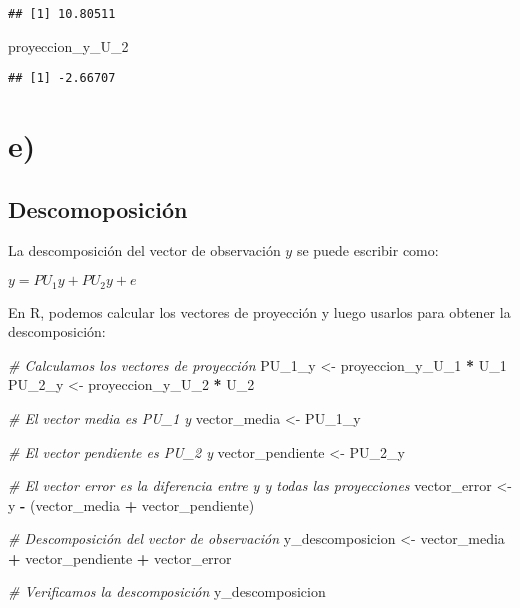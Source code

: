 \documentclass[
]{article}
\newenvironment{Shaded}{\begin{snugshade}}{\end{snugshade}}
\newcommand{\CommentTok}[1]{\textcolor[rgb]{0.56,0.35,0.01}{\textit{#1}}}
\newcommand{\NormalTok}[1]{#1}
\newcommand{\OtherTok}[1]{\textcolor[rgb]{0.56,0.35,0.01}{#1}}
\newcommand{\SpecialCharTok}[1]{\textcolor[rgb]{0.81,0.36,0.00}{\textbf{#1}}}
\begin{document}
\begin{verbatim}
## [1] 10.80511
\end{verbatim}

\begin{Shaded}
\begin{Highlighting}[]
\NormalTok{proyeccion\_y\_U\_2}
\end{Highlighting}
\end{Shaded}

\begin{verbatim}
## [1] -2.66707
\end{verbatim}

\hypertarget{e}{%
\section{e)}\label{e}}

\hypertarget{descomoposiciuxf3n}{%
\subsection{Descomoposición}\label{descomoposiciuxf3n}}

La descomposición del vector de observación \(y\) se puede escribir
como:

\(y = PU_1 y + PU_2 y + e\)

En R, podemos calcular los vectores de proyección y luego usarlos para
obtener la descomposición:

\begin{Shaded}
\begin{Highlighting}[]
\CommentTok{\# Calculamos los vectores de proyección}
\NormalTok{PU\_1\_y }\OtherTok{\textless{}{-}}\NormalTok{ proyeccion\_y\_U\_1 }\SpecialCharTok{*}\NormalTok{ U\_1}
\NormalTok{PU\_2\_y }\OtherTok{\textless{}{-}}\NormalTok{ proyeccion\_y\_U\_2 }\SpecialCharTok{*}\NormalTok{ U\_2}

\CommentTok{\# El vector media es PU\_1 y}
\NormalTok{vector\_media }\OtherTok{\textless{}{-}}\NormalTok{ PU\_1\_y}

\CommentTok{\# El vector pendiente es PU\_2 y}
\NormalTok{vector\_pendiente }\OtherTok{\textless{}{-}}\NormalTok{ PU\_2\_y}

\CommentTok{\# El vector error es la diferencia entre y y todas las proyecciones}
\NormalTok{vector\_error }\OtherTok{\textless{}{-}}\NormalTok{ y }\SpecialCharTok{{-}}\NormalTok{ (vector\_media }\SpecialCharTok{+}\NormalTok{ vector\_pendiente)}

\CommentTok{\# Descomposición del vector de observación}
\NormalTok{y\_descomposicion }\OtherTok{\textless{}{-}}\NormalTok{ vector\_media }\SpecialCharTok{+}\NormalTok{ vector\_pendiente }\SpecialCharTok{+}\NormalTok{ vector\_error}

\CommentTok{\# Verificamos la descomposición}
\NormalTok{y\_descomposicion}
\end{Highlighting}
\end{Shaded}
\end{document}
